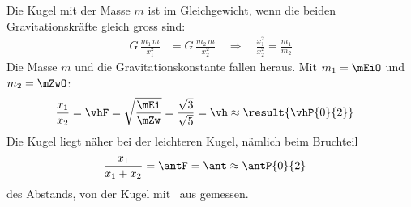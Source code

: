 \begin{center}
\end{center}

Die Kugel mit der Masse $m$ ist im Gleichgewicht, wenn die beiden Gravitationskräfte gleich gross sind:
\begin{align}
 G\,\frac{m_1\,m}{x_1^2} &= G\,\frac{m_2\,m}{x_2^2}
 \quad\Rightarrow\quad \frac{x_1^2}{x_2^2} = \frac{m_1}{m_2}
\end{align}
Die Masse $m$ und die Gravitationskonstante fallen heraus. Mit $m_1 = \mEiO$ und $m_2 = \mZwO$:
\begin{align}
 \frac{x_1}{x_2} &= \vhF = \sqrt{\frac{\mEi}{\mZw}} = \frac{\sqrt{3}}{\sqrt{5}} = \vh \approx \result{\vhP{0}{2}}
\end{align}
Die Kugel liegt näher bei der leichteren Kugel, nämlich beim Bruchteil
\begin{align}
 \frac{x_1}{x_1+x_2} &= \antF = \ant \approx \antP{0}{2}
\end{align}
des Abstands, von der Kugel mit \mEiO\ aus gemessen.
